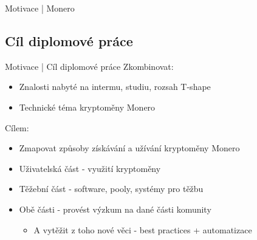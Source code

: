 \documentclass{beamer}
\begin{document}
\begin{darkframes}
\begin{frame}{Motivace | Monero}
    \end{frame}
    \subsection{Cíl diplomové práce}
    \begin{frame}{Motivace | Cíl diplomové práce}
     Zkombinovat:
     \begin{itemize}
     \item Znalosti nabyté na intermu, studiu, rozsah T-shape
     \item Technické téma kryptoměny Monero
     \end{itemize}
     	Cílem:
		\begin{itemize}
		\item Zmapovat způsoby získávání a užívání kryptoměny Monero
		\item Uživatelská část - využití kryptoměny
		\item Těžební část - software, pooly, systémy pro těžbu
		\item Obě části - provést výzkum na dané části komunity
		\begin{itemize}
		\item A vytěžit z toho nové věci - best practices + automatizace
		\end{itemize}
		\end{itemize}
    \end{frame}
  \end{darkframes}

    
\end{document}
